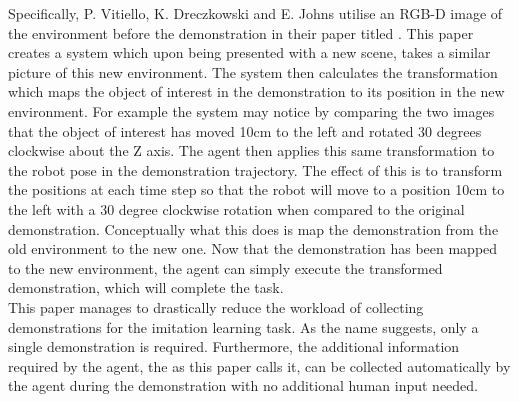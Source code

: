 Specifically, P. Vitiello, K. Dreczkowski and E. Johns utilise an RGB-D image of the environment before the demonstration in their paper titled  \cite{one-shot-pose-estimate}. This paper creates a system which upon being presented with a new scene, takes a similar picture of this new environment. The system then calculates the transformation which maps the object of interest in the demonstration to its position in the new environment. For example the system may notice by comparing the two images that the object of interest has moved 10cm to the left and rotated 30 degrees clockwise about the Z axis. The agent then applies this same transformation to the robot pose in the demonstration trajectory. The effect of this is to transform the positions at each time step so that the robot will move to a position 10cm to the left with a 30 degree clockwise rotation when compared to the original demonstration. Conceptually what this does is map the demonstration from the old environment to the new one. Now that the demonstration has been mapped to the new environment, the agent can simply execute the transformed demonstration, which will complete the task.\\
This paper manages to drastically reduce the workload of collecting demonstrations for the imitation learning task. As the name  suggests, only a single demonstration is required. Furthermore, the additional information required by the agent, the  as this paper calls it, can be collected automatically by the agent during the demonstration with no additional human input needed.\\

